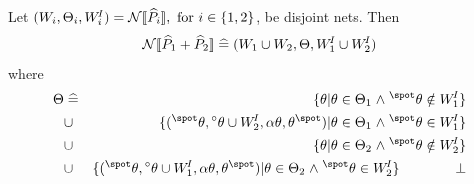 \begin{definition}  
Let $(W_i,\Theta_i,W^{\!I}_i) = {\mathcal{N}[\![{\widehat{P}}_i]\!]}, \text{ for } i \in \{1,2\}$, 
be disjoint nets. Then
\[{\mathcal{N}[\![{\widehat{P}}_1 \mathbin{\mathrm{+}} {\widehat{P}}_2]\!]} \mathrel{\widehat=} (W_1 \cup W_2, \Theta, W^{\!I}_1 \cup W^{\!I}_2)\] where
\begin{eqnarray*}
\T & \defs & \{\tr | \tr \in \T_1 \land \preset{\tr} \notin \WI_1\} \\
   & \cup  & \{(\preset{\tr},\vset{\tr} \cup \WI_2,\attr{\tr},\postset{\tr}) |
                 \tr \in \T_1 \land \preset{\tr} \in \WI_1\} \\
   & \cup  & \{\tr | \tr \in \T_2 \land \preset{\tr} \notin \WI_2\} \\
   & \cup  & \{(\preset{\tr},\vset{\tr} \cup \WI_1,\attr{\tr},\postset{\tr}) |
                 \tr \in \T_2 \land \preset{\tr} \in \WI_2\} \quad\quad\quad\quad\qed
\end{eqnarray*}
\end{definition}


